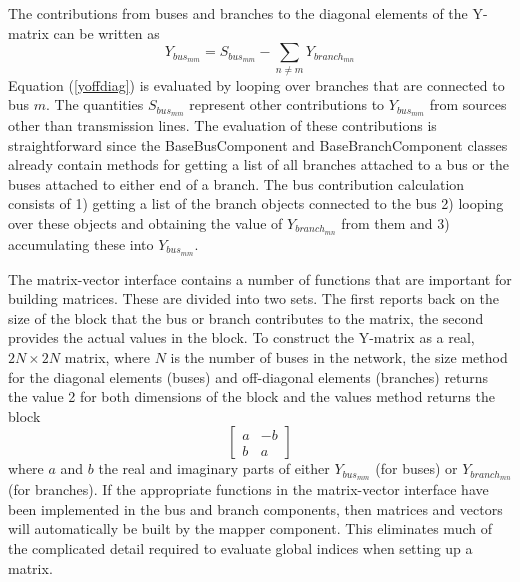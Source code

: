 \documentclass[preprint]{acm_proc_article-sp}
\begin{document}
The contributions from buses and branches to the diagonal elements of the Y-matrix
can be written as
\begin{equation}
\label{yoffdiag}
Y_{bus_{mm}} = S_{bus_{mm}} -\sum_{n\ne m}Y_{branch_{mn}}
\end{equation}
Equation (\ref{yoffdiag}) is evaluated by looping over branches
that are connected to bus $m$. The quantities $S_{bus_{mm}}$ represent other
contributions to $Y_{bus_{mm}}$ from sources other than transmission lines.
The evaluation of these contributions is
straightforward since the BaseBusComponent and BaseBranchComponent classes already contain
methods for getting a list of all branches attached to a bus or the buses
attached to either end of a branch. The bus contribution calculation consists of
1) getting a list of the branch objects connected to the bus 2) looping over
these objects and obtaining the value of $Y_{branch_{mn}}$ from them and
3) accumulating these into $Y_{bus_{mm}}$.

The matrix-vector interface contains a number of functions that are important
for building matrices. These are divided into two sets. The first reports
back on the size of the block that the bus or branch contributes to the matrix,
the second provides the actual values in the block. To construct the Y-matrix as
a real, $2N\times 2N$ matrix, where $N$ is the number of buses in the network,
the size method for the diagonal elements (buses) and off-diagonal elements
(branches) returns the value 2 for both dimensions of the block and the values
method returns the block
\begin{equation}
\nonumber
\left[ \begin{array}{rr} a & -b \\ b & a\end{array} \right]
\end{equation}
where $a$ and $b$ the real and imaginary parts of either $Y_{bus_{mm}}$ (for
buses) or $Y_{branch_{mn}}$ (for branches). If the appropriate functions in the
matrix-vector interface have been implemented in the bus and branch components,
then matrices and vectors will automatically be built by the mapper component.
This eliminates much of the complicated detail required to evaluate global
indices when setting up a matrix.
\end{document}
